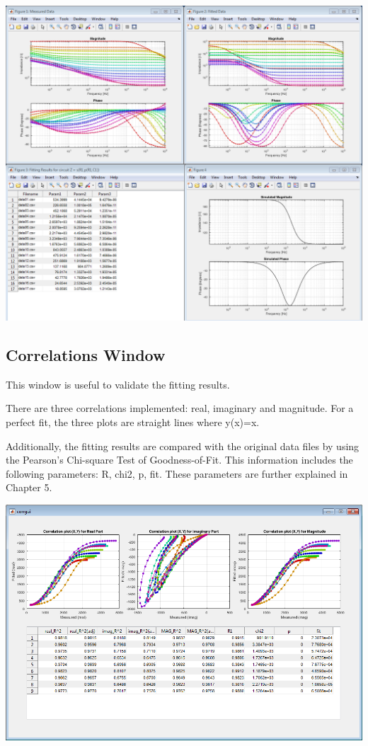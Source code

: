\documentclass[10pt,b5paper,oneside]{book}
\begin{document}
\includegraphics[width=\textwidth]{scr_results.png}

\subsection{Correlations Window}

This window is useful to validate the fitting results. 

There are three correlations implemented: real, imaginary and magnitude. For a perfect fit, the three plots are straight lines where y(x)=x.

Additionally, the fitting results are compared with the original data files by using the Pearson's Chi-square Test of Goodness-of-Fit. This information includes the following parameters: R, chi2, p, fit. These parameters are further explained in Chapter 5.

\includegraphics[width=\textwidth]{correlations.png}
\end{document}
